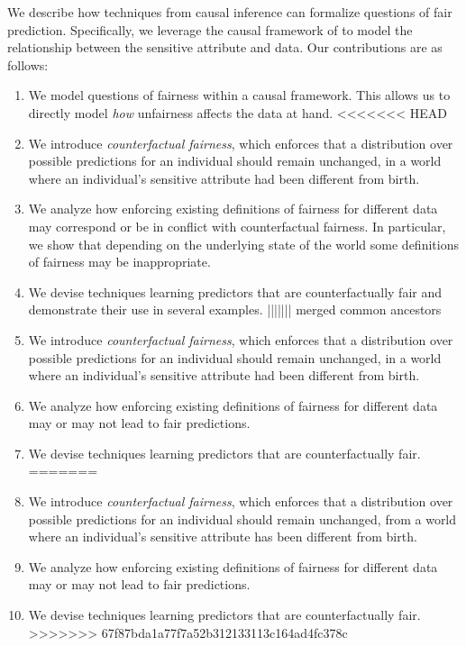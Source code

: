 We describe how techniques from causal inference can formalize questions of fair prediction. Specifically, we
leverage the causal framework of 
\citet{pearl2009causal} to model the relationship between the sensitive
attribute and data. Our contributions are as follows:
\begin{enumerate}
    \item We model questions of fairness within a causal framework. This allows us to directly model \emph{how} unfairness affects the data at hand.
<<<<<<< HEAD
    \item We introduce \emph{counterfactual fairness}, which enforces that a distribution over possible predictions for an individual should remain unchanged, in a world where an individual's sensitive attribute had been different from birth.
    \item We analyze how enforcing existing definitions of fairness for different data may correspond or be in conflict with counterfactual fairness. In particular, we show that depending on the underlying state of the world some definitions of fairness may be inappropriate.
    \item We devise techniques learning predictors that are counterfactually fair and demonstrate their use in several examples.
||||||| merged common ancestors
    \item We introduce \emph{counterfactual fairness}, which enforces that a distribution over possible predictions for an individual should remain unchanged, in a world where an individual's sensitive attribute had been different from birth.
    \item We analyze how enforcing existing definitions of fairness for different data may or may not lead to fair predictions.
    \item We devise techniques learning predictors that are counterfactually fair.
=======
    \item We introduce \emph{counterfactual fairness}, which enforces that a distribution over possible predictions for an individual should remain unchanged, from a world where an individual's sensitive attribute has been different from birth.
    \item We analyze how enforcing existing definitions of fairness for different data may or may not lead to fair predictions.
    \item We devise techniques learning predictors that are counterfactually fair.
>>>>>>> 67f87bda1a77f7a52b312133113c164ad4fc378c
\end{enumerate}












